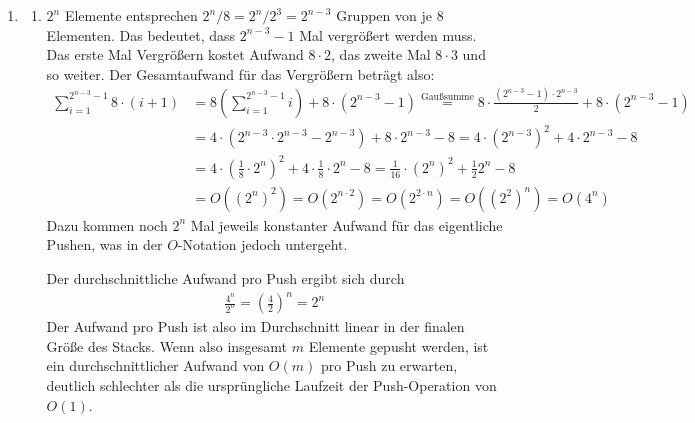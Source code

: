 \documentclass[11pt,a4paper]{article}
\begin{document}
\begin{loesung}
\begin{enumerate}
        \item
        \begin{enumerate}[label=(\roman*)]
            \item
            $2^n$ Elemente entsprechen $2^n / 8 = 2^n / 2^3 = 2^{n - 3}$ Gruppen von je 8 Elementen.
            Das bedeutet, dass $2^{n - 3} - 1$ Mal vergrößert werden muss.
            Das erste Mal Vergrößern kostet Aufwand $8 \cdot 2$, das zweite Mal $8 \cdot 3$ und so weiter.
            Der Gesamtaufwand für das Vergrößern beträgt also:
            \begin{align*}
                \sum\limits_{i = 1}^{2^{n - 3} - 1} 8 \cdot (i + 1)
                &= 8\left(\sum\limits_{i = 1}^{2^{n - 3} - 1} i\right) + 8 \cdot \left(2^{n - 3} - 1\right)
                \overset{\text{Gaußsumme}}{=} 8 \cdot \frac{\left(2^{n - 3} - 1\right) \cdot 2^{n - 3}}{2} + 8 \cdot \left(2^{n - 3} - 1\right) \\ 
                & = 4 \cdot \left( 2^{n - 3} \cdot 2^{n - 3} - 2^{n - 3}\right) + 8 \cdot 2^{n - 3} - 8
                = 4 \cdot \left(2^{n - 3}\right)^2 + 4 \cdot 2^{n - 3} - 8 \\
                &=4 \cdot \left(\frac{1}{8} \cdot 2^n\right)^2 + 4 \cdot \frac{1}{8} \cdot 2^n - 8
                = \frac{1}{16} \cdot \left(2^n\right)^2 + \frac{1}{2} 2^n - 8 \\
                &= O\left(\left(2^n\right)^2\right)
                = O\left(2^{n \cdot 2}\right)
                = O\left(2^{2 \cdot n}\right)
                = O\left(\left(2^2\right)^n\right)
                = O\left(4^n\right)
            \end{align*}
            Dazu kommen noch $2^n$ Mal jeweils konstanter Aufwand für das eigentliche Pushen, was in der $O$-Notation jedoch untergeht.

            Der durchschnittliche Aufwand pro Push ergibt sich durch
            \begin{align*}
                \frac{4^n}{2^n} = \left(\frac{4}{2}\right)^n = 2^n
            \end{align*}
            Der Aufwand pro Push ist also im Durchschnitt linear in der finalen Größe des Stacks.
            Wenn also insgesamt $m$ Elemente gepusht werden, ist ein durchschnittlicher Aufwand von $O(m)$ pro Push zu erwarten, deutlich schlechter als die ursprüngliche Laufzeit der Push-Operation von $O(1)$.


\end{enumerate}
\end{enumerate}
\end{loesung}
\end{document}
